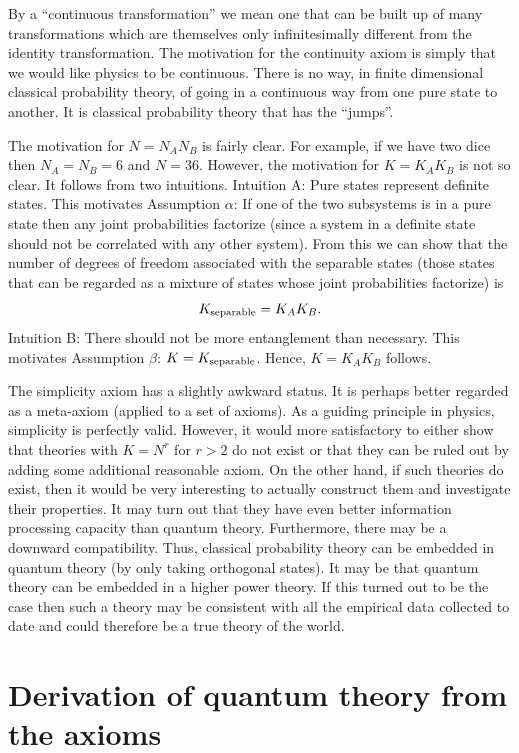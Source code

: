 \documentclass[10pt]{article}
\begin{document}
By a ``continuous transformation'' we mean one that can be built up of many
transformations which are themselves only infinitesimally different from
the identity transformation.
The motivation for the continuity axiom is simply that we would like
physics to be continuous.  There is no way, in finite dimensional
classical probability theory, of going in a continuous way from one pure
state to another.  It is classical probability theory that has the
``jumps''.

The motivation for $N=N_AN_B$ is fairly clear.  For example, if we have
two dice then $N_A=N_B=6$ and $N=36$.  However, the motivation for
$K=K_AK_B$ is not so clear.  It follows from two intuitions.
Intuition A: Pure states represent definite states.  This motivates
Assumption $\alpha$: If one of the two subsystems is in a pure
state then any joint
probabilities factorize (since a system in a definite state should not
be correlated with any other system).  From this we can show that the
number of degrees of freedom associated with the separable states (those
states that can be regarded as a mixture of states whose joint probabilities
factorize) is
\begin{equation}
K_{\rm separable} = K_A K_B.
\end{equation}
Intuition B: There should not be more entanglement than necessary.
This motivates Assumption $\beta$: $K=K_{\rm separable}$.
Hence, $K=K_AK_B$ follows.

The simplicity axiom has a slightly awkward status.  It is perhaps
better regarded as a meta-axiom (applied to a set of axioms).  As a
guiding principle in physics, simplicity is perfectly valid. However, it
would more satisfactory to either show that theories with $K=N^r$ for
$r>2$ do not exist or that they can be ruled out by adding some
additional reasonable axiom.  On the other hand, if such theories do
exist, then it would be very interesting to actually construct them and
investigate their properties.  It may turn out that they have even
better information processing capacity than quantum theory.
Furthermore, there may be a downward compatibility. Thus, classical
probability theory can be embedded in quantum theory (by only taking
orthogonal states).  It may be that quantum theory can be embedded in a
higher power theory.  If this turned out to be the case then such a
theory may be consistent with all the empirical data collected to date
and could therefore be a true theory of the world.

\section{Derivation of quantum theory from the axioms}
\end{document}
